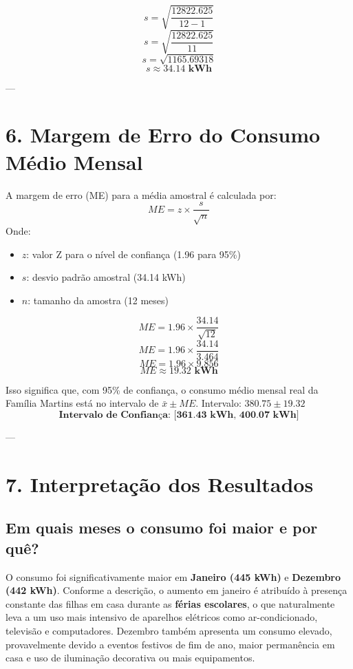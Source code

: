 \documentclass{article}
\begin{document}
$$ s = \sqrt{\frac{12822.625}{12-1}} $$
$$ s = \sqrt{\frac{12822.625}{11}} $$
$$ s = \sqrt{1165.69318} $$
$$ s \approx \mathbf{34.14 \text{ kWh}} $$

---

\section*{6. Margem de Erro do Consumo Médio Mensal}

A margem de erro (ME) para a média amostral é calculada por:
$$ ME = z \times \frac{s}{\sqrt{n}} $$
Onde:
\begin{itemize}
    \item $z$: valor Z para o nível de confiança (1.96 para 95\%)
    \item $s$: desvio padrão amostral (34.14 kWh)
    \item $n$: tamanho da amostra (12 meses)
\end{itemize}

$$ ME = 1.96 \times \frac{34.14}{\sqrt{12}} $$
$$ ME = 1.96 \times \frac{34.14}{3.464} $$
$$ ME = 1.96 \times 9.856 $$
$$ ME \approx \mathbf{19.32 \text{ kWh}} $$

Isso significa que, com 95\% de confiança, o consumo médio mensal real da Família Martins está no intervalo de $\bar{x} \pm ME$.
Intervalo: $380.75 \pm 19.32$
$$ \textbf{Intervalo de Confiança: [361.43 kWh, 400.07 kWh]} $$

---

\section*{7. Interpretação dos Resultados}

\subsection*{Em quais meses o consumo foi maior e por quê?}
O consumo foi significativamente maior em \textbf{Janeiro (445 kWh)} e \textbf{Dezembro (442 kWh)}. Conforme a descrição, o aumento em janeiro é atribuído à presença constante das filhas em casa durante as \textbf{férias escolares}, o que naturalmente leva a um uso mais intensivo de aparelhos elétricos como ar-condicionado, televisão e computadores. Dezembro também apresenta um consumo elevado, provavelmente devido a eventos festivos de fim de ano, maior permanência em casa e uso de iluminação decorativa ou mais equipamentos.
\end{document}
